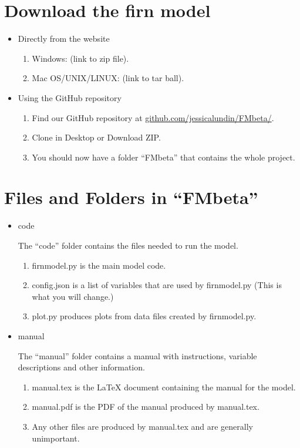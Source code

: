 \documentclass{article}
\begin{document}
\section{Download the firn model}

\begin{itemize}
  \item Directly from the website
  \begin{enumerate}
    \item Windows: (link to zip file).
    \item Mac OS/UNIX/LINUX: (link to tar ball).
  \end{enumerate}

  \item Using the GitHub repository 
  \begin{enumerate}
    \item Find our GitHub repository at \href{https://github.com/jessicalundin/FMbeta/}{github.com/jessicalundin/FMbeta/}.
    \item Clone in Desktop or Download ZIP.
    \item You should now have a folder ``FMbeta'' that contains the whole project.
  \end{enumerate}
\end{itemize}

\section{Files and Folders in ``FMbeta''}
\begin{itemize}
  \item code

  The ``code'' folder contains the files needed to run the model.
  \begin{enumerate}
    \item firnmodel.py is the main model code.
    \item config.json is a list of variables that are used by firnmodel.py (This is what you will change.)
    \item plot.py produces plots from data files created by firnmodel.py.
  \end{enumerate}
  \item manual

  The ``manual'' folder contains a manual with instructions, variable descriptions and other information.
  \begin{enumerate} 
    \item manual.tex is the LaTeX document containing the manual for the model.
    \item manual.pdf is the PDF of the manual produced by manual.tex.
    \item Any other files are produced by manual.tex and are generally unimportant.
    
  \end{enumerate}
\end{itemize}
\end{document}
